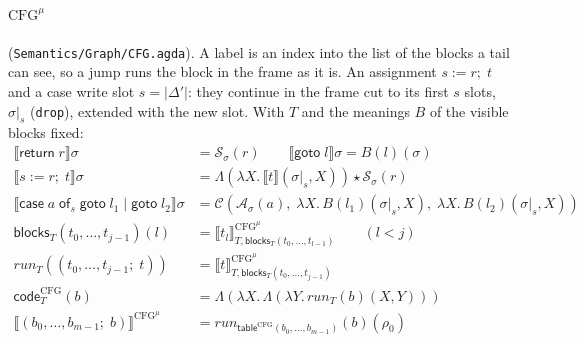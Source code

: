 \documentclass[10pt]{article}
\theoremstyle{acmplain}
\newcommand{\SEM}[1]{\llbracket #1 \rrbracket}
\newcommand{\key}[1]{\mathsf{#1}}
\newcommand{\app}{\star}
\newcommand{\assign}[3]{#1 \mathrel{:=} #2;\; #3}
\newcommand{\Treturn}[1]{\key{return}\;#1}
\newcommand{\Tgoto}[1]{\key{goto}\;#1}
\newcommand{\Tcase}[4]{\key{case}\;#1\;\key{of}_{#2}\;\key{goto}\;#3 \mid \key{goto}\;#4}
\newcommand{\Tcut}[2]{#1|_{#2}}                %
\newcommand{\Ml}[1]{\textrm{#1}^{\mu}}                  %
\begin{document}
\paragraph{$\Ml{CFG}$} (\texttt{Semantics/Graph/CFG.agda}). A label is an
index into the list of the blocks a tail can see, so a jump runs the
block in the frame as it is. An assignment $\assign{s}{r}{t}$ and a case
write slot $s = |\Delta'|$: they continue in the frame cut to its first
$s$ slots, $\Tcut{\sigma}{s}$ (\texttt{drop}), extended with the new slot.
With $T$ and the meanings $B$ of the visible blocks fixed:
\begin{align*}
  \SEM{\Treturn{r}}\sigma &= \mathcal{S}_\sigma(r) \qquad
  \SEM{\Tgoto{l}}\sigma = B(l)(\sigma) \\
  \SEM{\assign{s}{r}{t}}\sigma &=
    \Lambda(\lambda X.\, \SEM{t}(\Tcut{\sigma}{s}, X)) \app \mathcal{S}_\sigma(r) \\
  \SEM{\Tcase{a}{s}{l_1}{l_2}}\sigma &=
    \mathcal{C}(\mathcal{A}_\sigma(a),\;
      \lambda X.\, B(l_1)(\Tcut{\sigma}{s}, X),\; \lambda X.\, B(l_2)(\Tcut{\sigma}{s}, X)) \\[1ex]
  \key{blocks}_T(t_0, \ldots, t_{j-1})(l) &=
    \SEM{t_l}^{\Ml{CFG}}_{T,\key{blocks}_T(t_0, \ldots, t_{l-1})} \qquad (l < j) \\
  \mathit{run}_T((t_0, \ldots, t_{j-1};\; t)) &= \SEM{t}^{\Ml{CFG}}_{T,\key{blocks}_T(t_0, \ldots, t_{j-1})} \\
  \key{code}^{\mathrm{CFG}}_T(b) &= \Lambda(\lambda X.\, \Lambda(\lambda Y.\, \mathit{run}_T(b)(X, Y))) \\
  \SEM{(b_0, \ldots, b_{m-1};\; b)}^{\Ml{CFG}} &=
    \mathit{run}_{\key{table}^{\mathrm{CFG}}(b_0,\ldots,b_{m-1})}(b)(\rho_0)
\end{align*}
\end{document}
